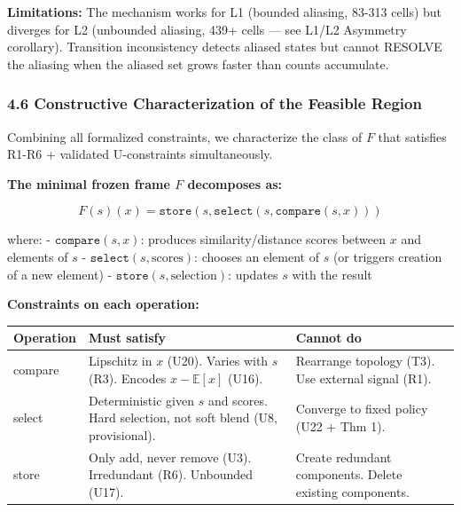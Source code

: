 \documentclass[
  11pt,
]{article}
\newcounter{none} %
\begin{document}
\textbf{Limitations:} The mechanism works for L1 (bounded aliasing,
83-313 cells) but diverges for L2 (unbounded aliasing, 439+ cells ---
see L1/L2 Asymmetry corollary). Transition inconsistency detects aliased
states but cannot RESOLVE the aliasing when the aliased set grows faster
than counts accumulate.

\subsubsection{4.6 Constructive Characterization of the Feasible
Region}\label{constructive-characterization-of-the-feasible-region}

Combining all formalized constraints, we characterize the class of \(F\)
that satisfies R1-R6 + validated U-constraints simultaneously.

\textbf{The minimal frozen frame \(F\) decomposes as:}

\[F(s)(x) = \texttt{store}(s, \texttt{select}(s, \texttt{compare}(s, x)))\]

where: - \(\texttt{compare}(s, x)\): produces similarity/distance scores
between \(x\) and elements of \(s\) -
\(\texttt{select}(s, \text{scores})\): chooses an element of \(s\) (or
triggers creation of a new element) -
\(\texttt{store}(s, \text{selection})\): updates \(s\) with the result

\textbf{Constraints on each operation:}

{\def\LTcaptype{none} %
\begin{longtable}[]{@{}
  >{\raggedright\arraybackslash}p{}
  >{\raggedright\arraybackslash}p{}
  >{\raggedright\arraybackslash}p{}@{}}
\toprule\noalign{}
\begin{minipage}[b]{\linewidth}\raggedright
Operation
\end{minipage} & \begin{minipage}[b]{\linewidth}\raggedright
Must satisfy
\end{minipage} & \begin{minipage}[b]{\linewidth}\raggedright
Cannot do
\end{minipage} \\
\midrule\noalign{}
\endhead
\bottomrule\noalign{}
\endlastfoot
compare & Lipschitz in \(x\) (U20). Varies with \(s\) (R3). Encodes
\(x - \mathbb{E}[x]\) (U16). & Rearrange topology (T3). Use external
signal (R1). \\
select & Deterministic given \(s\) and scores. Hard selection, not soft
blend (U8, provisional). & Converge to fixed policy (U22 + Thm 1). \\
store & Only add, never remove (U3). Irredundant (R6). Unbounded (U17).
& Create redundant components. Delete existing components. \\
\end{longtable}
}
\end{document}
